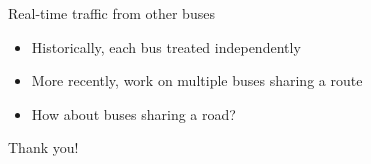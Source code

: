 \documentclass[10pt,t]{beamer}
\begin{document}
\begin{frame}{Real-time traffic from other buses}
  \begin{itemize}[<+->]
  \item Historically, each bus treated independently
  \item More recently, work on multiple buses sharing a route
  \item How about buses sharing a road?
  \end{itemize}
\end{frame}


\begin{frame}[standout]
  Thank you!
\end{frame}
\end{document}
